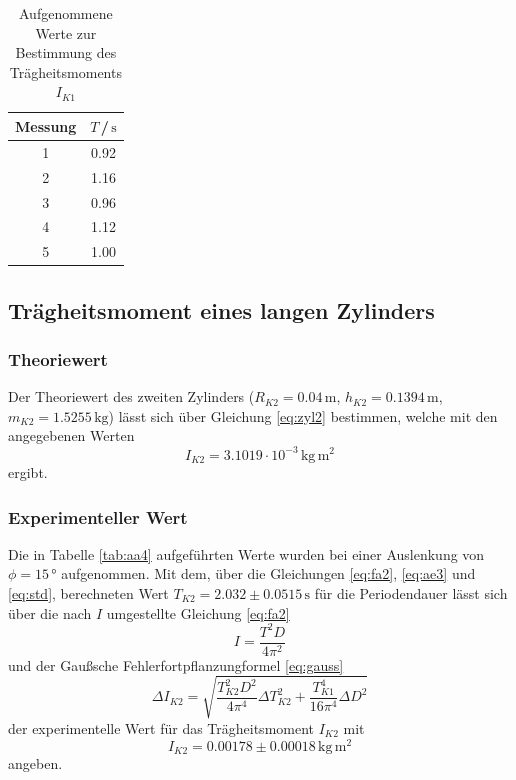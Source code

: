 \begin{table}[H]
\normalsize

\centering
{}
\begin{tabular}{c c}
\toprule
    Messung  & $T$\,/\,$\si{\second}$ \\
    \midrule

1  &   0.92   \\
2  &   1.16   \\
3  &   0.96   \\
4  &   1.12   \\
5  &   1.00   \\

    \bottomrule
\end{tabular}
\caption{Aufgenommene Werte zur Bestimmung des Trägheitsmoments $I_{K1}$}
\label{tab:a4}
\end{table}










\subsection{Trägheitsmoment eines langen Zylinders}
\subsubsection{Theoriewert}
Der Theoriewert des zweiten Zylinders 
($R_{K2} = 0.04\, \si{\meter}$, $h_{K2} = 0.1394\, \si{\meter}$, $m_{K2} = 1.5255\, \si{\kilogram}$) 
lässt sich über Gleichung \ref{eq:zyl2}
bestimmen, welche mit den angegebenen Werten
\begin{equation}
    I_{K2} = 3.1019\cdot 10^{-3}\, \si{\kilogram}\,\si{\meter\squared}
\end{equation} 
\noindent
ergibt.

\subsubsection{Experimenteller Wert}
Die in Tabelle \ref{tab:aa4} aufgeführten Werte wurden bei einer 
Auslenkung von $\phi = 15\,°$ aufgenommen. Mit dem, über die Gleichungen \ref{eq:fa2},
\ref{eq:ae3} und \ref{eq:std}, berechneten
Wert $T_{K2} = 2.032 \pm 0.0515\, \si{\second}$
für die Periodendauer lässt sich über die nach $I$ umgestellte Gleichung \ref{eq:fa2}
\begin{equation}
    I = \frac{T^2 D}{4 \pi^2}
\end{equation}
und der Gaußsche Fehlerfortpflanzungformel \ref{eq:gauss}
\begin{equation} 
    \Delta I_{K2} = \sqrt{\frac{T_{K2}^2 D^2}{4 \pi^4}\Delta T_{K2}^2 + \frac{T_{K1}^4}{16 \pi^4}\Delta D^2} 
\end{equation}
\noindent
der experimentelle Wert für das Trägheitsmoment $I_{K2}$ mit
\begin{equation}
    I_{K2} = 0.00178 \pm 0.00018\, \si{\kilogram}\,\si{\meter\squared}
\end{equation}
\noindent
angeben.

